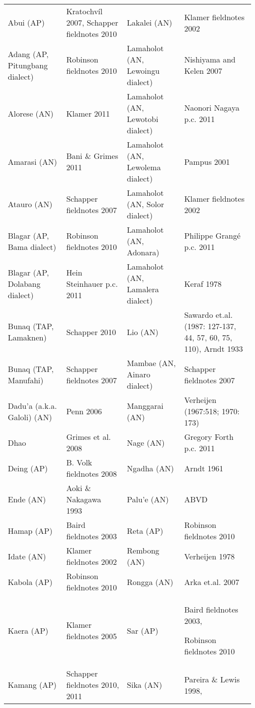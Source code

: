 \begin{flushleft}
\tablehead{}
\begin{supertabular}{m{1.0830599in}m{1.7080599in}m{1.7962599in}m{1.7115599in}}
Abui (AP) &
Kratochv\'il 2007, Schapper fieldnotes 2010 &
Lakalei (AN) &
Klamer fieldnotes  2002\\
Adang (AP, Pitungbang dialect) &
Robinson fieldnotes 2010 &
Lamaholot (AN, Lewoingu dialect) &
Nishiyama and Kelen 2007\\
Alorese (AN)  &
Klamer 2011 &
Lamaholot (AN, Lewotobi dialect) &
Naonori Nagaya p.c. 2011\\
Amarasi (AN) &
Bani \& Grimes 2011 &
Lamaholot (AN, Lewolema dialect) &
Pampus 2001\\
Atauro (AN)  &
Schapper fieldnotes 2007 &
Lamaholot (AN, Solor dialect) &
Klamer fieldnotes  2002\\
Blagar (AP, Bama dialect)  &
Robinson fieldnotes 2010 &
Lamaholot (AN, Adonara) &
Philippe Grang\'e p.c. 2011\\
Blagar (AP, Dolabang dialect)  &
Hein Steinhauer p.c. 2011 &
Lamaholot (AN, Lamalera dialect) &
Keraf 1978\\
Bunaq (TAP, Lamaknen) &
Schapper 2010 &
Lio (AN) &
Sawardo et.al. (1987: 127-137, 44, 57, 60, 75, 110), Arndt 1933\\
Bunaq (TAP, Manufahi) &
Schapper fieldnotes 2007 &
Mambae (AN, Ainaro dialect) &
Schapper fieldnotes 2007\\
Dadu{\textquoteright}a (a.k.a. Galoli) (AN) &
Penn 2006 &
Manggarai (AN) &
Verheijen (1967:518; 1970: 173)\\
Dhao &
Grimes et al. 2008 &
Nage (AN)  &
Gregory Forth p.c. 2011\\
Deing (AP) &
B. Volk fieldnotes 2008 &
Ngadha (AN) &
Arndt 1961\\
Ende (AN) &
Aoki \& Nakagawa 1993 &
Palu{\textquoteright}e (AN) &
ABVD \\
Hamap (AP)  &
Baird fieldnotes 2003 &
Reta (AP) &
Robinson fieldnotes 2010\\
Idate (AN) &
Klamer fieldnotes  2002 &
Rembong (AN) &
Verheijen 1978\\
Kabola (AP)  &
Robinson fieldnotes 2010 &
Rongga (AN) &
Arka et.al. 2007\\
Kaera (AP) &
Klamer fieldnotes 2005 &
Sar (AP)  &
Baird fieldnotes 2003, 

Robinson fieldnotes 2010\\
Kamang (AP) &
Schapper fieldnotes 2010, 2011 &
Sika (AN) &
Pareira \& Lewis 1998,  


\end{supertabular}
\end{flushleft}
